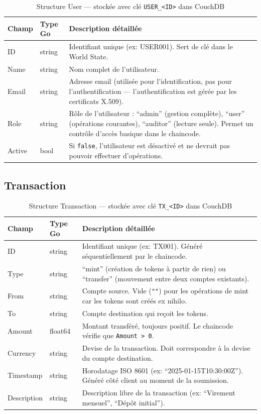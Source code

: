 \documentclass[12pt,a4paper,twoside]{report}
\begin{document}
\begin{table}[H]
\centering
\begin{tabularx}{\textwidth}{llX}
\toprule
\textbf{Champ} & \textbf{Type Go} & \textbf{Description détaillée} \\
\midrule
ID & string & Identifiant unique (ex: USER001). Sert de clé dans le World State. \\
Name & string & Nom complet de l'utilisateur. \\
Email & string & Adresse email (utilisée pour l'identification, pas pour l'authentification --- l'authentification est gérée par les certificats X.509). \\
Role & string & Rôle de l'utilisateur : ``admin'' (gestion complète), ``user'' (opérations courantes), ``auditor'' (lecture seule). Permet un contrôle d'accès basique dans le chaincode. \\
Active & bool & Si \texttt{false}, l'utilisateur est désactivé et ne devrait pas pouvoir effectuer d'opérations. \\
\bottomrule
\end{tabularx}
\caption{Structure User --- stockée avec clé \texttt{USER\_<ID>} dans CouchDB}
\end{table}

\subsection{Transaction}

\begin{table}[H]
\centering
\begin{tabularx}{\textwidth}{llX}
\toprule
\textbf{Champ} & \textbf{Type Go} & \textbf{Description détaillée} \\
\midrule
ID & string & Identifiant unique (ex: TX001). Généré séquentiellement par le chaincode. \\
Type & string & ``mint'' (création de tokens à partir de rien) ou ``transfer'' (mouvement entre deux comptes existants). \\
From & string & Compte source. Vide (\texttt{""}) pour les opérations de mint car les tokens sont créés ex nihilo. \\
To & string & Compte destination qui reçoit les tokens. \\
Amount & float64 & Montant transféré, toujours positif. Le chaincode vérifie que \texttt{Amount > 0}. \\
Currency & string & Devise de la transaction. Doit correspondre à la devise du compte destination. \\
Timestamp & string & Horodatage ISO 8601 (ex: ``2025-01-15T10:30:00Z''). Généré côté client au moment de la soumission. \\
Description & string & Description libre de la transaction (ex: ``Virement mensuel'', ``Dépôt initial''). \\
\bottomrule
\end{tabularx}
\caption{Structure Transaction --- stockée avec clé \texttt{TX\_<ID>} dans CouchDB}
\end{table}
\end{document}
